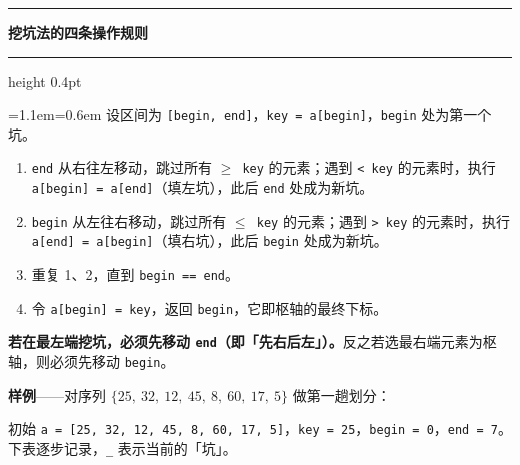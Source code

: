 \documentclass[11pt,openany,UTF8]{ctexbook}
\newcommand{\callouthead}[2]{%
  \par\addvspace{7pt}\noindent
  {\color{#1}\rule[-0.15em]{3pt}{1.05em}}\hspace{0.5em}%
  {\bfseries\color{#1}#2}\par\nobreak\vspace{-0.35em}%
  {\color{rulesep}\hrule height 0.4pt}\nobreak\vspace{0.45em}%
  \begingroup\small\setlength{\parindent}{0pt}%
  \leftskip=1.1em\rightskip=0.6em\noindent\ignorespaces}
\newcommand{\calloutend}{\par\endgroup\addvspace{7pt}}
\newenvironment{callkey}[1]{\callouthead{keybar}{#1}}{\calloutend}
\begin{document}
\begin{callkey}{挖坑法的四条操作规则}
设区间为 \texttt{[begin,\allowbreak{} end]\allowbreak{}}，\texttt{key =\allowbreak{} a[begin]\allowbreak{}}，\texttt{begin} 处为第一个坑。

\begin{enumerate}
\item \texttt{end} 从右往左移动，跳过所有 \texttt{$\ge$ key} 的元素；遇到 \texttt{<\allowbreak{} key} 的元素时，执行 \texttt{a[begin]\allowbreak{} =\allowbreak{} a[end]\allowbreak{}}（填左坑），此后 \texttt{end} 处成为新坑。
\item \texttt{begin} 从左往右移动，跳过所有 \texttt{$\le$ key} 的元素；遇到 \texttt{>\allowbreak{} key} 的元素时，执行 \texttt{a[end]\allowbreak{} =\allowbreak{} a[begin]\allowbreak{}}（填右坑），此后 \texttt{begin} 处成为新坑。
\item 重复 1、2，直到 \texttt{begin =\allowbreak{}=\allowbreak{} end}。
\item 令 \texttt{a[begin]\allowbreak{} =\allowbreak{} key}，返回 \texttt{begin}，它即枢轴的最终下标。
\end{enumerate}
\textbf{若在最左端挖坑，必须先移动 \texttt{end}（即「先右后左」）。}反之若选最右端元素为枢轴，则必须先移动 \texttt{begin}。

\end{callkey}

\textbf{样例}——对序列 $\{25,\ 32,\ 12,\ 45,\ 8,\ 60,\ 17,\ 5\}$ 做第一趟划分：

初始 \texttt{a =\allowbreak{} [25,\allowbreak{} 32,\allowbreak{} 12,\allowbreak{} 45,\allowbreak{} 8,\allowbreak{} 60,\allowbreak{} 17,\allowbreak{} 5]\allowbreak{}}，\texttt{key =\allowbreak{} 25}，\texttt{begin =\allowbreak{} 0}，\texttt{end =\allowbreak{} 7}。下表逐步记录，\texttt{\_} 表示当前的「坑」。
\end{document}
